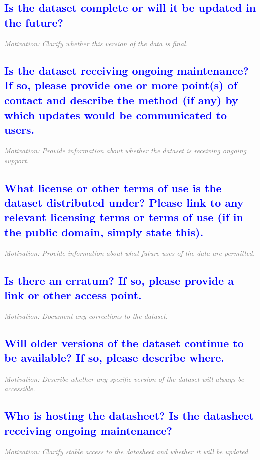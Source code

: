 \documentclass[letterpaper, 10 pt, transmag]{IEEEtran}
\begin{document}
\textcolor{blue}{\subsection{Is the dataset complete or will it be updated in the future?}}
\textcolor{gray}{\textit{Motivation: Clarify whether this version of the data is final.}}

\textcolor{blue}{\subsection{Is the dataset receiving ongoing maintenance? If so, please provide one or more point(s) of contact and describe the method (if any) by which updates would be communicated to users.}}
\textcolor{gray}{\textit{Motivation: Provide information about whether the dataset is receiving ongoing support.}}  

\textcolor{blue}{\subsection{What license or other terms of use is the dataset distributed under? Please link to any relevant licensing terms or terms of use (if in the public domain, simply state this).}}
\textcolor{gray}{\textit{Motivation: Provide information about what future uses of the data are permitted.}}

\textcolor{blue}{\subsection{Is there an erratum? If so, please provide a link or other access point.}}
\textcolor{gray}{\textit{Motivation: Document any corrections to the dataset.}}

\textcolor{blue}{\subsection{Will older versions of the dataset continue to be available? If so, please describe where.}}
\textcolor{gray}{\textit{Motivation: Describe whether any specific version of the dataset will always be accessible.}}

\textcolor{blue}{\subsection{Who is hosting the datasheet? Is the datasheet receiving ongoing maintenance?}}
\textcolor{gray}{\textit{Motivation: Clarify stable access to the datasheet and whether it will be updated.}}
\end{document}
